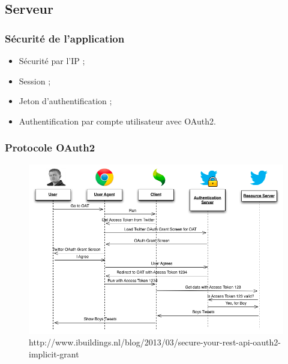 \subsection{Serveur}
	\begin{frame}
		\frametitle{Sécurité de l'application}
		\begin{itemize}
			\item Sécurité par l'IP ;
			\item Session ;
			\item Jeton d'authentification ;
			\item Authentification par compte utilisateur avec OAuth2.
		\end{itemize}
	\end{frame}

	\begin{frame}
		\frametitle{Protocole OAuth2}
		\begin{figure}[H]
			\centering
			\includegraphics[width=1\textwidth]{images/oauth2.png}
			\caption{http://www.ibuildings.nl/blog/2013/03/secure-your-rest-api-oauth2-implicit-grant}
		\end{figure}

	\end{frame}

